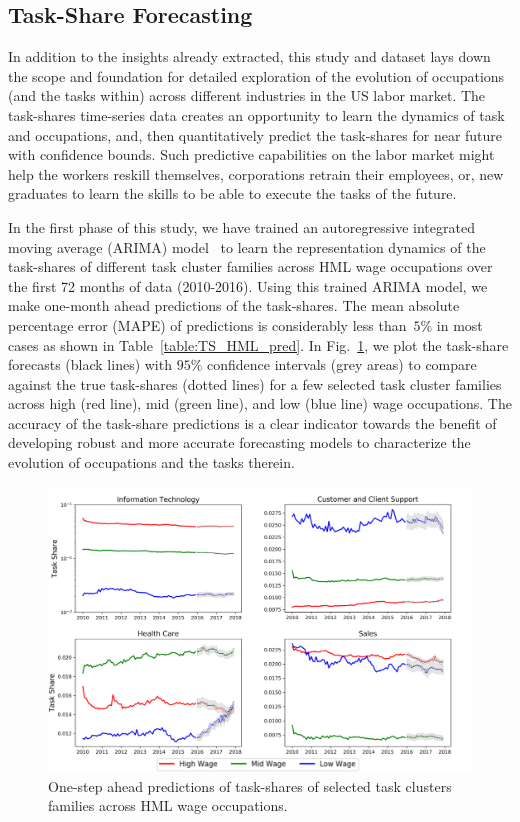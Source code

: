 \documentclass[letterpaper]{article} %
\begin{document}
\subsection{Task-Share Forecasting}
\label{subsec:res_forecast}
%
In addition to the insights already extracted, this study and dataset lays down the scope and foundation for detailed exploration of the evolution of occupations (and the tasks within) across different industries in the US labor market. The task-shares time-series data creates an opportunity to learn the dynamics of task and occupations, and, then quantitatively predict the task-shares for near future with confidence bounds. Such predictive capabilities on the labor market might help the workers reskill themselves, corporations retrain their employees, or, new graduates to learn the skills to be able to execute the tasks of the future.

In the first phase of this study, we have trained an autoregressive integrated moving average (ARIMA) model~\cite{makridakis2008forecasting} to learn the representation dynamics of the task-shares of different task cluster families across HML wage occupations over the first 72 months of data (2010-2016). Using this trained ARIMA model, we make one-month ahead predictions of the task-shares. The mean absolute percentage error (MAPE) of predictions is considerably less than~$5\%$ in most cases as shown in Table~\ref{table:TS_HML_pred}. In Fig.~\ref{fig:pred}, we plot the task-share forecasts (black lines) with $95\%$ confidence intervals (grey areas) to compare against the true task-shares (dotted lines) for a few selected task cluster families across high (red line), mid (green line), and low (blue line) wage occupations. The accuracy of the task-share predictions is a clear indicator towards the benefit of developing robust and more accurate forecasting models to characterize the evolution of occupations and the tasks therein. 
%
\begin{figure}[t!]
  \includegraphics[width=0.96\linewidth]{combined_pred.png}
  \caption{One-step ahead predictions of task-shares of selected task clusters families across HML wage occupations.}
  \label{fig:pred}
\end{figure}
%
\end{document}
